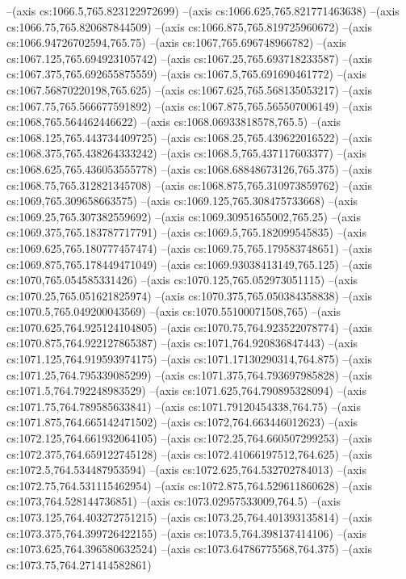 --(axis cs:1066.5,765.823122972699)
--(axis cs:1066.625,765.821771463638)
--(axis cs:1066.75,765.820687844509)
--(axis cs:1066.875,765.819725960672)
--(axis cs:1066.94726702594,765.75)
--(axis cs:1067,765.696748966782)
--(axis cs:1067.125,765.694923105742)
--(axis cs:1067.25,765.693718233587)
--(axis cs:1067.375,765.692655875559)
--(axis cs:1067.5,765.691690461772)
--(axis cs:1067.56870220198,765.625)
--(axis cs:1067.625,765.568135053217)
--(axis cs:1067.75,765.566677591892)
--(axis cs:1067.875,765.565507006149)
--(axis cs:1068,765.564462446622)
--(axis cs:1068.06933818578,765.5)
--(axis cs:1068.125,765.443734409725)
--(axis cs:1068.25,765.439622016522)
--(axis cs:1068.375,765.438264333242)
--(axis cs:1068.5,765.437117603377)
--(axis cs:1068.625,765.436053555778)
--(axis cs:1068.68848673126,765.375)
--(axis cs:1068.75,765.312821345708)
--(axis cs:1068.875,765.310973859762)
--(axis cs:1069,765.309658663575)
--(axis cs:1069.125,765.308475733668)
--(axis cs:1069.25,765.307382559692)
--(axis cs:1069.30951655002,765.25)
--(axis cs:1069.375,765.183787717791)
--(axis cs:1069.5,765.182099545835)
--(axis cs:1069.625,765.180777457474)
--(axis cs:1069.75,765.179583748651)
--(axis cs:1069.875,765.178449471049)
--(axis cs:1069.93038413149,765.125)
--(axis cs:1070,765.054585331426)
--(axis cs:1070.125,765.052973051115)
--(axis cs:1070.25,765.051621825974)
--(axis cs:1070.375,765.050384358838)
--(axis cs:1070.5,765.049200043569)
--(axis cs:1070.55100071508,765)
--(axis cs:1070.625,764.925124104805)
--(axis cs:1070.75,764.923522078774)
--(axis cs:1070.875,764.922127865387)
--(axis cs:1071,764.920836847443)
--(axis cs:1071.125,764.919593974175)
--(axis cs:1071.17130290314,764.875)
--(axis cs:1071.25,764.795339085299)
--(axis cs:1071.375,764.793697985828)
--(axis cs:1071.5,764.792248983529)
--(axis cs:1071.625,764.790895328094)
--(axis cs:1071.75,764.789585633841)
--(axis cs:1071.79120454338,764.75)
--(axis cs:1071.875,764.665142471502)
--(axis cs:1072,764.663446012623)
--(axis cs:1072.125,764.661932064105)
--(axis cs:1072.25,764.660507299253)
--(axis cs:1072.375,764.659122745128)
--(axis cs:1072.41066197512,764.625)
--(axis cs:1072.5,764.534487953594)
--(axis cs:1072.625,764.532702784013)
--(axis cs:1072.75,764.531115462954)
--(axis cs:1072.875,764.529611860628)
--(axis cs:1073,764.528144736851)
--(axis cs:1073.02957533009,764.5)
--(axis cs:1073.125,764.403272751215)
--(axis cs:1073.25,764.401393135814)
--(axis cs:1073.375,764.399726422155)
--(axis cs:1073.5,764.398137414106)
--(axis cs:1073.625,764.396580632524)
--(axis cs:1073.64786775568,764.375)
--(axis cs:1073.75,764.271414582861)
